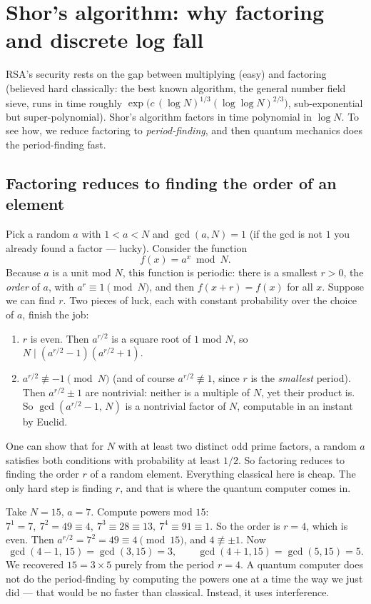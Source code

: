 \section{Shor's algorithm: why factoring and discrete log fall}
\label{ch35:shor}

RSA's security rests on the gap between multiplying (easy) and factoring (believed hard classically: the best known algorithm, the general number field sieve, runs in time roughly $\exp\!\big(c\,(\log N)^{1/3} \allowbreak (\log\log N)^{2/3}\big)$, sub-exponential but super-polynomial). Shor's algorithm factors in time polynomial in $\log N$. To see how, we reduce factoring to \emph{period-finding}, and then quantum mechanics does the period-finding fast.

\subsection{Factoring reduces to finding the order of an element}
\label{ch35:order-reduction}

Pick a random $a$ with $1 < a < N$ and $\gcd(a,N)=1$ (if the gcd is not $1$ you already found a factor --- lucky). Consider the function
\[
  f(x) = a^x \bmod N.
\]
Because $a$ is a unit mod $N$, this function is periodic: there is a smallest $r>0$, the \emph{order} of $a$, with $a^r \equiv 1 \pmod N$, and then $f(x+r)=f(x)$ for all $x$. Suppose we can find $r$. Two pieces of luck, each with constant probability over the choice of $a$, finish the job:

\begin{enumerate}
  \item $r$ is even. Then $a^{r/2}$ is a square root of $1$ mod $N$, so $N \mid (a^{r/2}-1)(a^{r/2}+1)$.
  \item $a^{r/2} \not\equiv -1 \pmod N$ (and of course $a^{r/2}\not\equiv 1$, since $r$ is the \emph{smallest} period). Then $a^{r/2}\pm 1$ are nontrivial: neither is a multiple of $N$, yet their product is. So $\gcd(a^{r/2}-1,\,N)$ is a nontrivial factor of $N$, computable in an instant by Euclid.
\end{enumerate}

One can show that for $N$ with at least two distinct odd prime factors, a random $a$ satisfies both conditions with probability at least $1/2$. So factoring reduces to finding the order $r$ of a random element. Everything classical here is cheap. The only hard step is finding $r$, and that is where the quantum computer comes in.

\begin{example}
\label{ch35:ex-15}
Take $N=15$, $a=7$. Compute powers mod $15$: $7^1=7,\ 7^2=49\equiv 4,\ 7^3\equiv 28\equiv 13,\ 7^4\equiv 91\equiv 1$. So the order is $r=4$, which is even. Then $a^{r/2}=7^2=49\equiv 4 \pmod{15}$, and $4\not\equiv \pm1$. Now
\[
  \gcd(4-1,\,15)=\gcd(3,15)=3,\qquad \gcd(4+1,15)=\gcd(5,15)=5.
\]
We recovered $15 = 3\times 5$ purely from the period $r=4$. A quantum computer does not do the period-finding by computing the powers one at a time the way we just did --- that would be no faster than classical. Instead, it uses interference.
\end{example}

